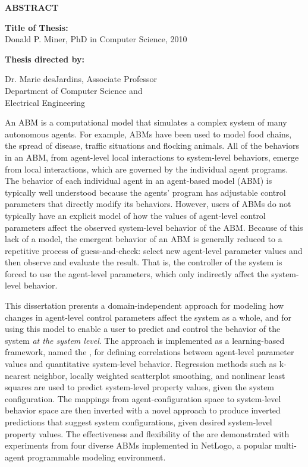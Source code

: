 \newpage
\pagestyle{empty}

\begin{center}
\vspace{0.1in}
\large{\bf ABSTRACT} \par  
\bigskip \bigskip
\end{center}

\begin{flushleft}
{\bf Title of Thesis:} \thesistitle\\
Donald P. Miner, PhD in Computer Science, 2010 \\
\begin{singlespace}
{\bf Thesis directed by:}{\hspace{2.5mm}} \parbox[t]{3in}{Dr. Marie desJardins, Associate Professor\\
Department of Computer Science and \\ Electrical Engineering}
\end{singlespace}
\end{flushleft}


An ABM is a computational model that simulates a complex system of many autonomous agents.
For example, ABMs have been used to model food chains, the spread of disease, traffic situations and flocking animals.
All of the behaviors in an ABM, from agent-level local interactions to system-level behaviors, emerge from local interactions, which are governed by the individual agent programs.
The behavior of each individual agent in an agent-based model (ABM) is typically well understood because the agents' program has adjustable control parameters that directly modify its behaviors.
However, users of ABMs do not typically have an explicit model of how the values of agent-level control parameters affect the observed system-level behavior of the ABM.
Because of this lack of a model, the emergent behavior of an ABM is generally reduced to a repetitive process of guess-and-check: select new agent-level parameter values and then observe and evaluate the result.
That is, the controller of the system is forced to use the agent-level parameters, which only indirectly affect the system-level behavior.

This dissertation presents a domain-independent approach for modeling how changes in agent-level control parameters affect the system as a whole, and for using this model to enable a user to predict and control the behavior of the system \textit{at the system level}.
The approach is implemented as a learning-based framework, named the \framework,  for defining correlations between agent-level parameter values and quantitative system-level behavior.
Regression methods such as k-nearest neighbor, locally weighted scatterplot smoothing, and nonlinear least squares are used to predict system-level property values, given the system configuration.
The mappings from agent-configuration space to system-level behavior space are then inverted with a novel approach to produce inverted predictions that suggest system configurations, given desired system-level property values.
The effectiveness and flexibility of the \framework are demonstrated with experiments from four diverse ABMs implemented in NetLogo, a popular multi-agent programmable modeling environment.



\par\vfil


